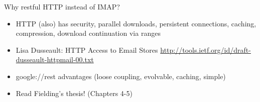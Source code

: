 \documentclass{beamer}
\begin{document}
\begin{frame}{Why restful HTTP instead of IMAP?}
  \begin{itemize}
  \item HTTP (also) has security, parallel downloads, persistent connections, caching, compression, download continuation via ranges
  \item Lisa Dusseault: HTTP Access to Email Stores \url{http://tools.ietf.org/id/draft-dusseault-httpmail-00.txt}
  \item google://rest advantages (loose coupling, evolvable, caching, simple)
  \item Read Fielding's thesis! (Chapters 4-5)
  \end{itemize}
\end{frame}
\end{document}
